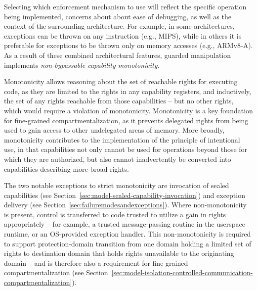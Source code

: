 Selecting which enforcement mechanism to use will reflect the specific
operation being implemented, concerns about about ease of debugging, as well
as the context of the surrounding architecture. For example, in some
architectures, exceptions can be thrown on any instruction (e.g., MIPS), while
in others it is preferable for exceptions to be thrown only on memory
accesses (e.g., ARMv8-A).
As a result of these combined architectural features, guarded manipulation
implements \textit{non-bypassable capability monotonicity}.

Monotonicity allows reasoning about the set of reachable rights for executing
code, as they are limited to the rights in any capability registers, and
inductively, the set of any rights reachable from those capabilities -- but no
other rights, which would require a violation of monotonicity.
Monotonicity is a key foundation for fine-grained compartmentalization, as it
prevents delegated rights from being used to gain access to other undelegated
areas of memory.
More broadly, monotonicity contributes to the implementation of the principle
of intentional use, in that capabilities not only cannot be used for
operations beyond those for which they are authorized, but also cannot
inadvertently be converted into capabilities describing more broad rights.

The two notable exceptions to strict monotonicity
 are invocation of sealed
capabilities (see Section~\ref{sec:model-sealed-capability-invocation}) and
exception delivery (see Section~\ref{sec:failuremodesandexceptions}).
Where non-monotonicity is present, control is transferred to code trusted to
utilize a gain in rights appropriately -- for example, a trusted
message-passing routine in the userspace runtime, or an OS-provided exception
handler.
This non-monotonicity is required to support protection-domain transition from
one domain holding a limited set of rights to destination domain that holds
rights unavailable to the originating domain -- and is therefore also
a requirement for fine-grained compartmentalization (see
Section~\ref{sec:model-isolation-controlled-communication-compartmentalization}).



